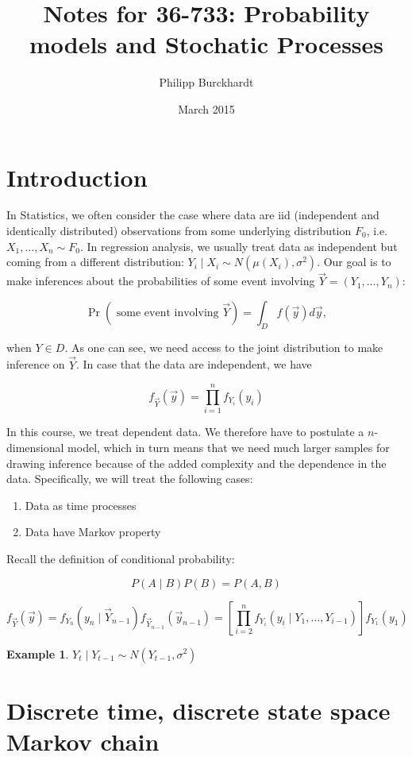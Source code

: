 \documentclass{article}
\title{Notes for 36-733: Probability models and Stochatic Processes}
\author{Philipp Burckhardt}
\date{March 2015}
\theoremstyle{definition}
\newtheorem{exmp}{Example}[section]
\begin{document}
\maketitle

\section{Introduction}

In Statistics, we often consider the case where data are iid (independent and identically distributed) observations from some underlying distribution $F_0$, i.e. $X_1, \ldots, X_n \sim F_0$. In regression analysis, we usually treat data as independent but coming from a different distribution:
$Y_i \mid X_i \sim N \left( \mu(X_i), \sigma^2 \right)$.
Our goal is to make inferences about the probabilities of some event involving $\vec{Y} = \left( Y_1, \ldots, Y_n \right)$:

$$
\Pr \left( \text{ some event involving } \vec{Y} \right) = \int_D f(\vec{y}) d\vec{y},
$$

when $Y \in D$. As one can see, we need access to the joint distribution to make inference on $\vec{Y}$. 
In case that the data are independent, we have

$$
f_{\vec{Y}} \left( \vec{y} \right) = \prod_{i=1}^n f_{Y_i} \left(y_i \right)
$$

In this course, we treat dependent data. We therefore have to postulate a $n$-dimensional model, which in turn means that we need much larger samples for drawing inference because of the added complexity and the dependence in the data.
Specifically, we will treat the following cases:
\begin{enumerate}
\item Data as time processes
\item Data have Markov property
\end{enumerate}

Recall the definition of conditional probability:

$$
P (A \mid B) P(B) = P(A, B)
$$

$$
f_{\vec{Y}} \left( \vec{y} \right) = f_{Y_n} ( y_n \mid \vec{Y}_{n-1} ) f_{\vec{Y}_{n-1}} ( \vec{y}_{n-1} ) = \left[ \prod_{i=2}^n f_{Y_i} (y_i \mid Y_1, \ldots, Y_{i-1} ) \right] f_{Y_1} (y_1)
$$

\begin{exmp}
$Y_t \mid Y_{t-1} \sim N \left( Y_{t-1}, \sigma^2 \right)$
\end{exmp}

\section{Discrete time, discrete state space Markov chain}
\end{document}
